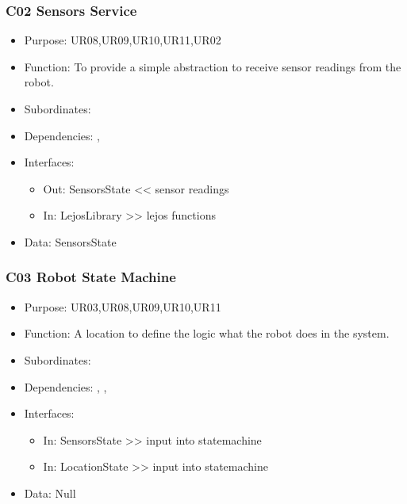 \subsubsection{C02 Sensors Service} \label{compSense}
\begin{itemize}
	\item Purpose: UR08,UR09,UR10,UR11,UR02
	\item Function: To provide a simple abstraction to receive sensor readings from the robot. 
	\item Subordinates: 
	\item Dependencies: , 
	\item Interfaces:
	\begin{itemize}
		\item Out: SensorsState << sensor readings
		\item In: LejosLibrary >> lejos functions
	\end{itemize}
	\item Data: SensorsState
\end{itemize}

\subsubsection{C03 Robot State Machine} \label{compState}
\begin{itemize}
	\item Purpose: UR03,UR08,UR09,UR10,UR11
	\item Function: A location to define the logic what the robot does in the system.
	\item Subordinates: 
	\item Dependencies: , , 
	\item Interfaces:
	\begin{itemize}
		\item In: SensorsState >> input into statemachine
		\item In: LocationState >> input into statemachine
	\end{itemize}
	\item Data: Null
\end{itemize}

